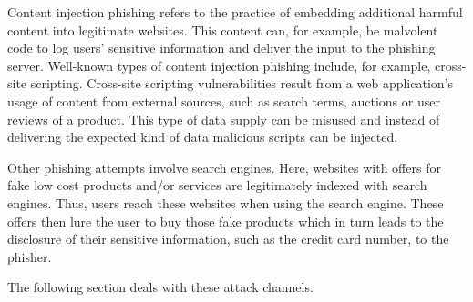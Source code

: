\begin{description}[leftmargin=0cm]
	\item[Content Injection Phishing] Content injection phishing refers to the practice of embedding additional harmful content into legitimate websites.
 This content can, for example, be malvolent code to log users' sensitive information and deliver the input to the phishing server.
 Well-known types of content injection phishing include, for example, cross-site scripting.
 Cross-site scripting vulnerabilities result from a web application's usage of content from external sources, such as search terms, auctions or user reviews of a product.
 This type of data supply can be misused and instead of delivering the expected kind of data malicious scripts can be injected.

	\item[Search Engine Phishing] Other phishing attempts involve search engines.
 Here, websites with offers for fake low cost products and/or services are legitimately indexed with search engines.
 Thus, users reach these websites when using the search engine.
 These offers then lure the user to buy those fake products which in turn leads to the disclosure of their sensitive information, such as the credit card number, to the phisher.

\end{description}

 The following section deals with these attack channels.



